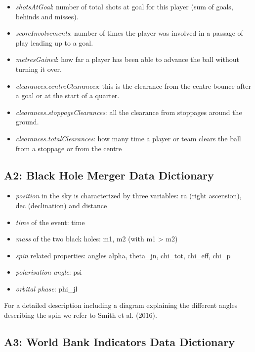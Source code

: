 \begin{itemize}
\item
  \emph{shotsAtGoal}: number of total shots at goal for this player (sum of goals, behinds and misses).
\item
  \emph{scoreInvolvements}: number of times the player was involved in a passage of play leading up to a goal.
\item
  \emph{metresGained}: how far a player has been able to advance the ball without turning it over.
\item
  \emph{clearances.centreClearances}: this is the clearance from the centre bounce after a goal or at the start of a quarter.
\item
  \emph{clearances.stoppageClearances}: all the clearance from stoppages around the ground.
\item
  \emph{clearances.totalClearances}: how many time a player or team clears the ball from a stoppage or from the centre
\end{itemize}

\hypertarget{a2-black-hole-merger-data-dictionary}{%
\subsection{A2: Black Hole Merger Data Dictionary}\label{a2-black-hole-merger-data-dictionary}}

\begin{itemize}
\tightlist
\item
  \emph{position} in the sky is characterized by three variables: ra (right ascension), dec (declination) and distance
\item
  \emph{time} of the event: time
\item
  \emph{mass} of the two black holes: m1, m2 (with m1 \textgreater{} m2)
\item
  \emph{spin} related properties: angles alpha, theta\_jn, chi\_tot, chi\_eff, chi\_p
\item
  \emph{polarisation angle}: psi
\item
  \emph{orbital phase}: phi\_jl
\end{itemize}

For a detailed description including a diagram explaining the different angles describing the spin we refer to Smith et al. (2016).

\hypertarget{a3-world-bank-indicators-data-dictionary}{%
\subsection{A3: World Bank Indicators Data Dictionary}\label{a3-world-bank-indicators-data-dictionary}}

